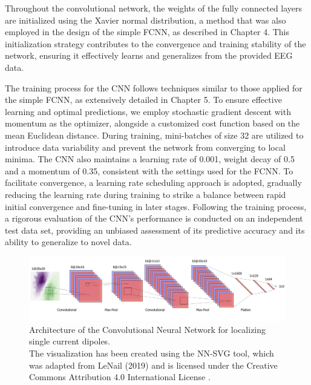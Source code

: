 \documentclass[a4paper, UKenglish, 11pt]{uiomaster}
\begin{document}
Throughout the convolutional network, the weights of the fully connected layers are initialized using the Xavier normal distribution, a method that was also employed in the design of the simple FCNN, as described in Chapter 4. This initialization strategy contributes to the convergence and training stability of the network, ensuring it effectively learns and generalizes from the provided EEG data.

The training process for the CNN follows techniques similar to those applied for the simple FCNN, as extensively detailed in Chapter 5. To ensure effective learning and optimal predictions, we employ stochastic gradient descent with momentum as the optimizer, alongside a customized cost function based on the mean Euclidean distance. During training, mini-batches of size 32 are utilized to introduce data variability and prevent the network from converging to local minima. The CNN also maintains a learning rate of 0.001, weight decay of 0.5 and a momentum of 0.35, consistent with the settings used for the FCNN. To facilitate convergence, a learning rate scheduling approach is adopted, gradually reducing the learning rate during training to strike a balance between rapid initial convergence and fine-tuning in later stages. Following the training process, a rigorous evaluation of the CNN's performance is conducted on an independent test data set, providing an unbiased assessment of its predictive accuracy and its ability to generalize to novel data.

\begin{figure}[!htb]
    \hspace*{-2cm} %
    \centering
    \includegraphics[scale=0.52]{figures/CNN.png}
    \caption{Architecture of the Convolutional Neural Network for localizing single current dipoles. \\
            The visualization has been created using the NN-SVG tool, which was adapted from LeNail (2019) and is licensed under the Creative Commons Attribution 4.0 International License \cite{lenail2019}.}
    \label{fig:architecture_CNN}
\end{figure}
\end{document}
